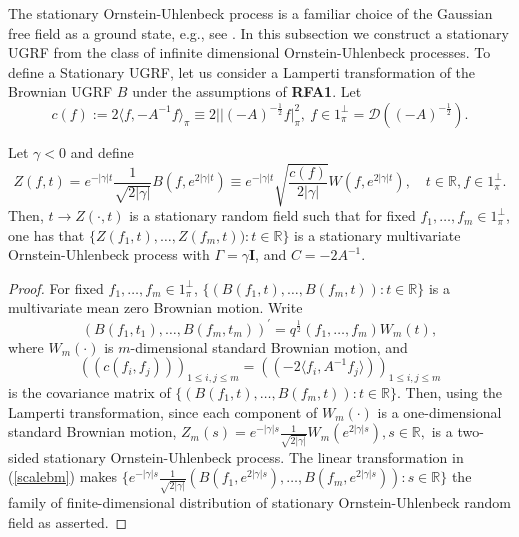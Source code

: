 \documentclass[11pt]{article}
\numberwithin{equation}{section}
\theoremstyle{definition}
\theoremstyle{remark}
\theoremstyle{definition}
\begin{document}
The stationary Ornstein-Uhlenbeck process is a
familiar choice of the Gaussian free field as a 
ground state, e.g., 
see \cite{newman}. 
In this subsection we
 construct a stationary UGRF from the class of 
infinite dimensional Ornstein-Uhlenbeck processes. 
To define a Stationary UGRF,  let us consider 
a Lamperti transformation of the Brownian UGRF $B$
under the assumptions of {\bf RFA1}.
Let
\begin{equation}
c(f) :=
2\langle f,-A^{-1}f\rangle_\pi\equiv
2||(-A)^{-\frac{1}{2}}f|^2_\pi, \ f\in1_\pi^\perp=
\mathcal{D}((-A)^{-\frac{1}{2}}).
\end{equation}
 \begin{thm}\label{statugrfthm}
 Let $\gamma<0$ and define
\begin{equation}Z(f,t) = 
 e^{-|\gamma|t}\frac{1}{\sqrt{2|\gamma|}}B(f,e^{2|\gamma|t})\equiv  
 e^{-|\gamma|t}\sqrt{\frac{c(f)}{2|\gamma|}}W(f,e^{2|\gamma|t}),
 \quad t\in\mathbb{R}, f\in
 1_\pi^\perp.\end{equation}
 Then, $t\to Z(\cdot,t)$ is a stationary random field such
 that for fixed $f_1,\dots,f_m\in1_\pi^\perp$,  one has that
 $\{Z(f_1,t),\dots,Z(f_m,t)):t\in\mathbb{R}\}$ is a stationary
 multivariate Ornstein-Uhlenbeck process with $\Gamma = \gamma{\mathbf I}$,
 and $C=-2A^{-1}$.
\end{thm}
\begin{proof}
For fixed $f_1,\dots,f_m\in1_\pi^\perp$, $\{(B(f_1,t),\dots,B(f_m,t)):t\in\mathbb{R}\}$ is a multivariate mean zero Brownian motion. Write 
\begin{equation}\label{scalebm}
(B(f_1,t_1),\dots,B(f_m,t_m))^{\prime} 
= q^{\frac{1}{2}}(f_1,\dots,f_m)W_m(t),
\end{equation}
where $W_m(\cdot)$ is $m$-dimensional standard Brownian motion,
and 
\begin{equation}\label{selfadjcov}
((c(f_i,f_j)))_{1\le i,j\le m} = ((-2\langle f_i,A^{-1}f_j\rangle))_{1\le i,j\le m}
\end{equation}
is the covariance matrix of $\{(B(f_1,t),\dots,B(f_m,t)):t\in\mathbb{R}\}$.
Then, using the Lamperti transformation, since each component 
of $W_m(\cdot)$ is a one-dimensional standard Brownian motion,
$Z_m(s) = e^{-|\gamma|s}\frac{1}{\sqrt{2|\gamma|}}W_m(e^{2|\gamma|s}), s\in\mathbb{R},$ is a two-sided
stationary Ornstein-Uhlenbeck process. The linear transformation
in (\ref{scalebm}) makes 
$\{e^{-|\gamma|s}\frac{1}{\sqrt{2|\gamma|}}(B(f_1,e^{2|\gamma|s}),\dots,B(f_m,e^{2|\gamma|s})):s\in\mathbb{R}\}
$ the family of
finite-dimensional distribution of stationary Ornstein-Uhlenbeck 
random field as asserted. 
\end{proof}
\end{document}
